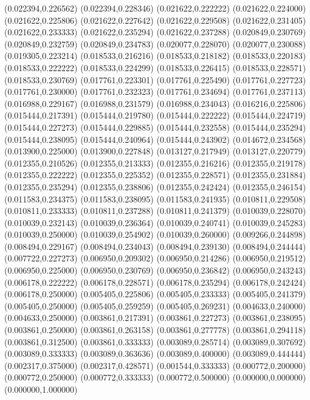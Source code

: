 (0.022394,0.226562)
(0.022394,0.228346)
(0.021622,0.222222)
(0.021622,0.224000)
(0.021622,0.225806)
(0.021622,0.227642)
(0.021622,0.229508)
(0.021622,0.231405)
(0.021622,0.233333)
(0.021622,0.235294)
(0.021622,0.237288)
(0.020849,0.230769)
(0.020849,0.232759)
(0.020849,0.234783)
(0.020077,0.228070)
(0.020077,0.230088)
(0.019305,0.223214)
(0.018533,0.216216)
(0.018533,0.218182)
(0.018533,0.220183)
(0.018533,0.222222)
(0.018533,0.224299)
(0.018533,0.226415)
(0.018533,0.228571)
(0.018533,0.230769)
(0.017761,0.223301)
(0.017761,0.225490)
(0.017761,0.227723)
(0.017761,0.230000)
(0.017761,0.232323)
(0.017761,0.234694)
(0.017761,0.237113)
(0.016988,0.229167)
(0.016988,0.231579)
(0.016988,0.234043)
(0.016216,0.225806)
(0.015444,0.217391)
(0.015444,0.219780)
(0.015444,0.222222)
(0.015444,0.224719)
(0.015444,0.227273)
(0.015444,0.229885)
(0.015444,0.232558)
(0.015444,0.235294)
(0.015444,0.238095)
(0.015444,0.240964)
(0.015444,0.243902)
(0.014672,0.234568)
(0.013900,0.225000)
(0.013900,0.227848)
(0.013127,0.217949)
(0.013127,0.220779)
(0.012355,0.210526)
(0.012355,0.213333)
(0.012355,0.216216)
(0.012355,0.219178)
(0.012355,0.222222)
(0.012355,0.225352)
(0.012355,0.228571)
(0.012355,0.231884)
(0.012355,0.235294)
(0.012355,0.238806)
(0.012355,0.242424)
(0.012355,0.246154)
(0.011583,0.234375)
(0.011583,0.238095)
(0.011583,0.241935)
(0.010811,0.229508)
(0.010811,0.233333)
(0.010811,0.237288)
(0.010811,0.241379)
(0.010039,0.228070)
(0.010039,0.232143)
(0.010039,0.236364)
(0.010039,0.240741)
(0.010039,0.245283)
(0.010039,0.250000)
(0.010039,0.254902)
(0.010039,0.260000)
(0.009266,0.244898)
(0.008494,0.229167)
(0.008494,0.234043)
(0.008494,0.239130)
(0.008494,0.244444)
(0.007722,0.227273)
(0.006950,0.209302)
(0.006950,0.214286)
(0.006950,0.219512)
(0.006950,0.225000)
(0.006950,0.230769)
(0.006950,0.236842)
(0.006950,0.243243)
(0.006178,0.222222)
(0.006178,0.228571)
(0.006178,0.235294)
(0.006178,0.242424)
(0.006178,0.250000)
(0.005405,0.225806)
(0.005405,0.233333)
(0.005405,0.241379)
(0.005405,0.250000)
(0.005405,0.259259)
(0.005405,0.269231)
(0.004633,0.240000)
(0.004633,0.250000)
(0.003861,0.217391)
(0.003861,0.227273)
(0.003861,0.238095)
(0.003861,0.250000)
(0.003861,0.263158)
(0.003861,0.277778)
(0.003861,0.294118)
(0.003861,0.312500)
(0.003861,0.333333)
(0.003089,0.285714)
(0.003089,0.307692)
(0.003089,0.333333)
(0.003089,0.363636)
(0.003089,0.400000)
(0.003089,0.444444)
(0.002317,0.375000)
(0.002317,0.428571)
(0.001544,0.333333)
(0.000772,0.200000)
(0.000772,0.250000)
(0.000772,0.333333)
(0.000772,0.500000)
(0.000000,0.000000)
(0.000000,1.000000)